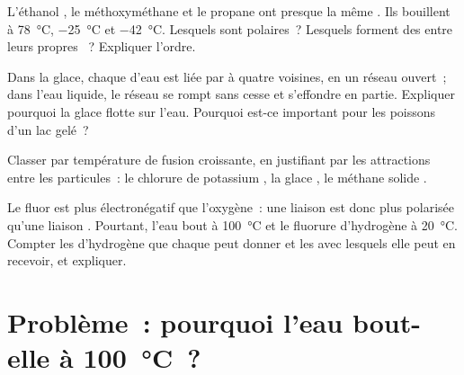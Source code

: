 \begin{exercise}[$\star\star\star$]\label{exo:g11:polarity-and-cohesion:12}
L'éthanol , le méthoxyméthane  et le propane
 ont presque la même . Ils bouillent à
\qty{78}{\celsius}, \qty{-25}{\celsius} et \qty{-42}{\celsius}. Lesquels
sont polaires~? Lesquels forment des  entre leurs
propres ~? Expliquer l'ordre.
\end{exercise}

\begin{exercise}[$\star\star\star$]\label{exo:g11:polarity-and-cohesion:13}
Dans la glace, chaque  d'eau est liée par  à
quatre voisines, en un réseau ouvert~; dans l'eau liquide, le réseau se
rompt sans cesse et s'effondre en partie. Expliquer pourquoi la glace
flotte sur l'eau. Pourquoi est-ce important pour les poissons d'un lac
gelé~?
\end{exercise}

\begin{exercise}[$\star\star\star$]\label{exo:g11:polarity-and-cohesion:14}
Classer par température de fusion croissante, en justifiant par les
attractions entre les particules~: le chlorure de potassium , la
glace , le méthane solide .
\end{exercise}

\begin{exercise}[$\star\star\star$]\label{exo:g11:polarity-and-cohesion:15}
Le fluor est plus électronégatif que l'oxygène~: une liaison  est
donc plus polarisée qu'une liaison . Pourtant, l'eau bout à
\qty{100}{\celsius} et le fluorure d'hydrogène à \qty{20}{\celsius}.
Compter les  d'hydrogène que chaque  peut donner et les
 avec lesquels elle peut en recevoir, et expliquer.
\end{exercise}

\section{Problème~: pourquoi l'eau bout-elle à \texorpdfstring{\qty{100}{\celsius}}{100 degrés Celsius}~?}

